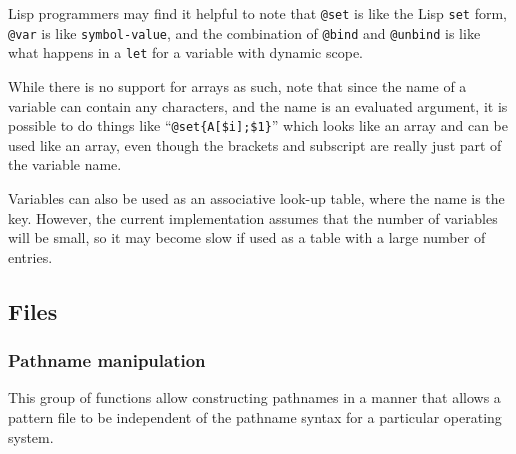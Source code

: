 Lisp programmers may find it helpful to note that \verb|@set| is
like the Lisp \verb|set| form, \verb|@var| is like \verb|symbol-value|,
and the combination of \verb|@bind| and \verb|@unbind| is like what
happens in a \verb|let| for a variable with dynamic scope.

While there is no support for arrays as such, note that since the name
of a variable can contain any characters, and the name is an evaluated
argument, it is possible to do things like
``\verb/@set{A[$i];$1}/'' which looks like an array and can be used like
an array, even though the brackets and subscript are really just part
of the variable name.

Variables can also be used as an associative look-up table, where the
name is the key.  However, the current implementation assumes that the
number of variables will be small, so it may become slow if used as a
table with a large number of entries.

\subsection{Files}

\subsubsection{Pathname manipulation}
This group of functions allow constructing pathnames in a manner that
allows a pattern file to be independent of the pathname syntax for a
particular operating system.

